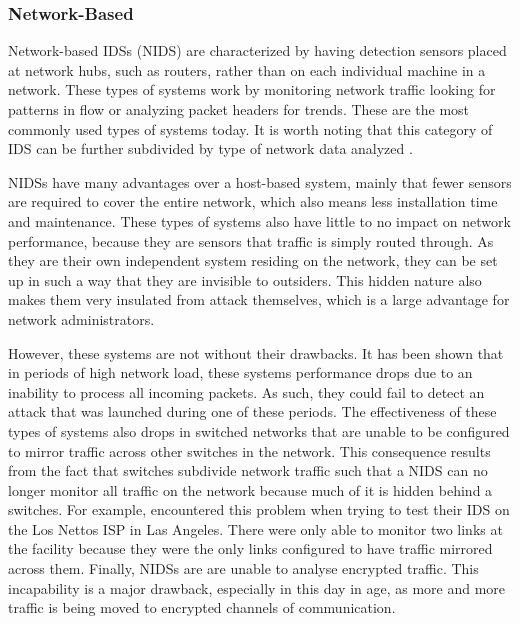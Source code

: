 \documentclass{acm_proc_article-sp}
\begin{document}
    	\subsubsection{Network-Based}
    		Network-based IDSs (NIDS) are characterized by having detection sensors placed at network hubs, such as routers, rather than on each individual machine in a network. These types of systems work by monitoring network traffic looking for patterns in flow or analyzing packet headers for trends. These are the most commonly used types of systems today. It is worth noting that this category of IDS can be further subdivided by type of network data analyzed \cite{Bhuyan2011}. 
    		
    		NIDSs have many advantages over a host-based system, mainly that fewer sensors are required to cover the entire network, which also means less installation time and maintenance. These types of systems also have little to no impact on network performance, because they are sensors that traffic is simply routed through. As they are their own independent system residing on the network, they can be set up in such a way that they are invisible to outsiders. This hidden nature also makes them very insulated from attack themselves, which is a large advantage for network administrators. 
    		
    		However, these systems are not without their drawbacks. It has been shown that in periods of high network load, these systems performance drops due to an inability to process all incoming packets. As such, they could fail to detect an attack that was launched during one of these periods. The effectiveness of these types of systems also drops in switched networks that are unable to be configured to mirror traffic across other switches in the network. This consequence results from the fact that switches subdivide network traffic such that a NIDS can no longer monitor all traffic on the network because much of it is hidden behind a switches. For example, \cite{Hussain2003} encountered this problem when trying to test their IDS on the Los Nettos ISP in Las Angeles. There were only able to monitor two links at the facility because they were the only links configured to have traffic mirrored across them.  Finally, NIDSs are are unable to analyse encrypted traffic. This incapability is a major drawback, especially in this day in age, as more and more traffic is being moved to encrypted channels of communication. 		
\end{document}

